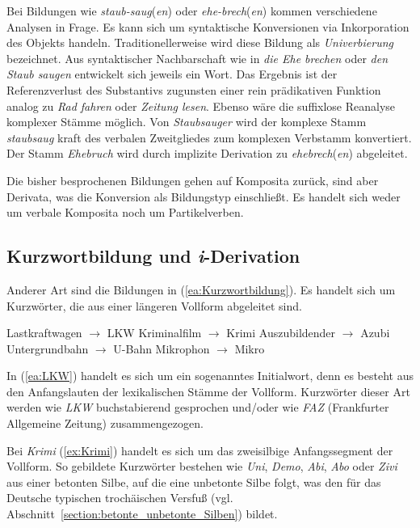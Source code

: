 Bei Bildungen wie \textit{staub-saug}(\textit{en}) oder \textit{ehe-brech}(\textit{en}) kommen verschiedene Analysen in Frage. Es kann sich um syntaktische Konversionen via Inkorporation des Objekts handeln. Traditionellerweise wird diese Bildung als \textit{Univerbierung} bezeichnet. Aus syntaktischer Nachbarschaft wie in \textit{die Ehe brechen} oder \textit{den Staub saugen} entwickelt sich jeweils ein Wort. Das Ergebnis ist der Referenzverlust des Substantivs zugunsten einer rein prädikativen Funktion analog zu \textit{Rad fahren} oder \textit{Zeitung lesen}. Ebenso wäre die suffixlose Reanalyse komplexer Stämme möglich. Von \textit{Staubsauger} wird der komplexe Stamm \textit{staubsaug} kraft des verbalen Zweitgliedes zum komplexen Verbstamm konvertiert. Der Stamm \textit{Ehebruch} wird durch implizite Derivation zu \textit{ehebrech}(\textit{en}) abgeleitet.

Die bisher besprochenen Bildungen gehen auf Komposita zurück, sind aber Derivata, was die Konversion als Bildungstyp einschließt. Es handelt sich weder um verbale Komposita noch um Partikelverben.


\subsection{Kurzwortbildung und \textit{i}-Derivation}\label{subsection:Kurzwort}

Anderer Art sind die Bildungen in (\ref{ea:Kurzwortbildung}). Es handelt sich um Kurzwörter, die aus einer längeren Vollform abgeleitet sind.

\ea \label{ea:Kurzwortbildung}
\ea \label{ea:LKW} Lastkraftwagen $\rightarrow$ LKW
\ex \label{ex:Krimi} Kriminalfilm $\rightarrow$ Krimi
\ex \label{ex:Azubi} Auszubildender $\rightarrow$ Azubi
\ex \label{ex:U-Bahn} Untergrundbahn $\rightarrow$ U-Bahn
\ex \label{ex:Mikro} Mikrophon $\rightarrow$ Mikro
\z 
\z 

In (\ref{ea:LKW}) handelt es sich um ein sogenanntes Initialwort, denn es besteht aus den Anfangslauten der lexikalischen Stämme der Vollform. Kurzwörter dieser Art werden wie \textit{LKW} buchstabierend gesprochen und/oder wie \textit{FAZ} (Frankfurter Allgemeine Zeitung) zusammengezogen.

Bei \textit{Krimi} (\ref{ex:Krimi}) handelt es sich um das zweisilbige Anfangssegment der Vollform. So gebildete Kurzwörter bestehen wie \textit{Uni}, \textit{Demo}, \textit{Abi}, \textit{Abo} oder \textit{Zivi} aus einer betonten Silbe, auf die eine unbetonte Silbe folgt, was den für das Deutsche typischen trochäischen Versfuß (vgl. Abschnitt~\ref{section:betonte_unbetonte_Silben}) bildet.   

